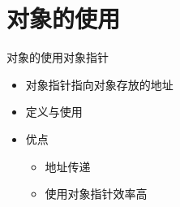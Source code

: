 \section[对象的使用]{对象的使用}\label{sec:chap03-sec03}
\begin{frame}[t, fragile]{对象的使用}{对象指针}%
  \stretchon
  \begin{itemize}
  \item 对象指针指向对象存放的地址
  \item 定义与使用\\
    \begin{minipage}{0.5\linewidth}
    \end{minipage}
  \item 优点
    \begin{itemize}
    \item 地址传递
    \item 使用对象指针效率高
    \end{itemize}
  \end{itemize}
  \stretchoff
\end{frame}

